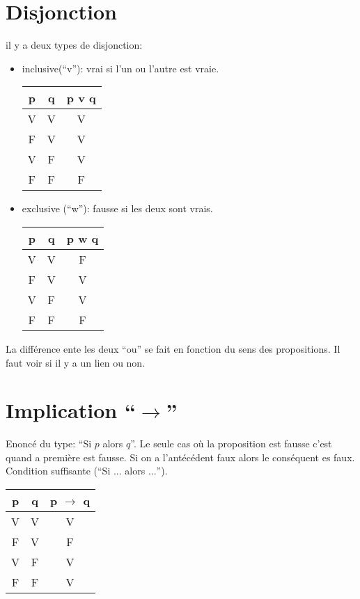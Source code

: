 \documentclass[11pt,a4paper]{article} %
\begin{document}
\section{Disjonction}
il y a deux types de disjonction:
\begin{itemize}
	\item inclusive(``v''): vrai si l'un ou l'autre est vraie.\\
		\begin{center}
			\begin{tabular}{|c|c||c|}
				\hline
				p&q& p v q\\
				\hline
				V&V&V\\
				\hline
				F&V&V\\
				\hline
				V&F&V\\
				\hline
				F&F&F\\
				\hline
			\end{tabular}
		\end{center}
	\item exclusive (``w''): fausse si les deux sont vrais.\\
		\begin{center}
			\begin{tabular}{|c|c||c|}
				\hline
				p&q&p w q\\
				\hline
				V&V&F\\
				\hline
				F&V&V\\
				\hline
				V&F&V\\
				\hline
				F&F&F\\
				\hline
			\end{tabular}
		\end{center}
\end{itemize}
La différence ente les deux ``ou'' se fait en fonction du sens des propositions.
Il faut voir si il y a un lien  ou non.
\section{Implication ``$\rightarrow$''}
Enoncé du type: ``Si $p$ alors $q$''.
Le seule cas où la proposition est fausse c'est quand a première est fausse.
Si on a l'antécédent faux alors le conséquent es faux.
Condition suffisante (``Si $...$ alors $...$'').
\begin{center}
	\begin{tabular}{|c|c||c|}
		\hline
		p&q&p $\rightarrow$ q\\
		\hline
		V&V&V\\
		\hline
		F&V&F\\
		\hline
		V&F&V\\
		\hline
		F&F&V\\
		\hline
	\end{tabular}
\end{center}
\end{document}
